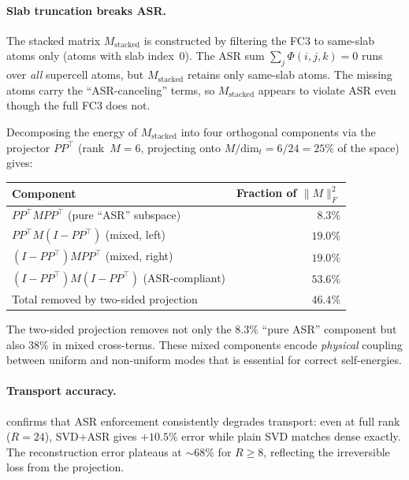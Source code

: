 \paragraph{Slab truncation breaks ASR.}
The stacked matrix $M_\mathrm{stacked}$ is constructed by filtering
the FC3 to same-slab atoms only (atoms with slab index~0).  The ASR
sum $\sum_j \Phi(i,j,k) = 0$ runs over \emph{all} supercell atoms,
but $M_\mathrm{stacked}$ retains only same-slab atoms.  The missing
atoms carry the ``ASR-canceling'' terms, so $M_\mathrm{stacked}$
appears to violate ASR even though the full FC3 does not.

Decomposing the energy of $M_\mathrm{stacked}$ into four orthogonal
components via the projector $PP^\top$ (rank~$M = 6$, projecting
onto $M/\mathrm{dim}_t = 6/24 = 25\%$ of the space) gives:
\begin{center}
\begin{tabular}{lr}
  \toprule
  Component & Fraction of $\|M\|_F^2$ \\
  \midrule
  $PP^\top M PP^\top$ (pure ``ASR'' subspace) & $8.3\%$ \\
  $PP^\top M (I{-}PP^\top)$ (mixed, left) & $19.0\%$ \\
  $(I{-}PP^\top) M PP^\top$ (mixed, right) & $19.0\%$ \\
  $(I{-}PP^\top) M (I{-}PP^\top)$ (ASR-compliant) & $53.6\%$ \\
  \midrule
  Total removed by two-sided projection & $46.4\%$ \\
  \bottomrule
\end{tabular}
\end{center}
The two-sided projection removes not only the $8.3\%$ ``pure ASR''
component but also $38\%$ in mixed cross-terms.  These mixed
components encode \emph{physical} coupling between uniform and
non-uniform modes that is essential for correct self-energies.

\paragraph{Transport accuracy.}
 confirms that ASR enforcement consistently
degrades transport: even at full rank ($R = 24$), SVD+ASR gives
$+10.5\%$ error while plain SVD matches dense exactly.
The reconstruction error plateaus at $\sim$68\% for $R \ge 8$,
reflecting the irreversible loss from the projection.

